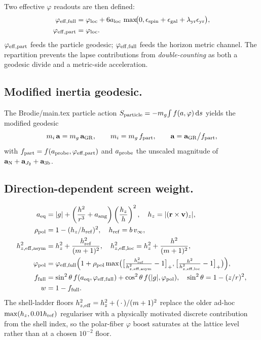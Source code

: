\documentclass[11pt]{amsart}
\begin{document}
Two effective $\varphi$ readouts are then defined:
\begin{align}
\varphi_{\rm eff,full} &= \varphi_{\rm loc}+6a_{\rm loc}\,
  \max\!\bigl(0,\epsilon_{\rm spin}+\epsilon_{\rm gal}+\lambda_{\rm yr}\epsilon_{\rm yr}\bigr),\\
\varphi_{\rm eff,part} &= \varphi_{\rm loc}.
\end{align}
$\varphi_{\rm eff,part}$ feeds the particle geodesic; $\varphi_{\rm eff,full}$ feeds the
horizon metric channel. The repartition prevents the lapse contributions from
\emph{double-counting} as both a geodesic divide and a metric-side acceleration.

\subsection{Modified inertia geodesic.}
The Brodie/main.tex particle action
\(S_{\rm particle}=-m_g\!\int f(a,\varphi)\,\mathrm ds\)
yields the modified geodesic
\begin{equation}\label{eq:geodesic}
m_i\,\mathbf a = m_g\,\mathbf a_{\rm GR},\qquad
m_i = m_g\, f_{\rm part},\qquad
\mathbf a = \mathbf a_{\rm GR}\big/f_{\rm part},
\end{equation}
with $f_{\rm part}=f(a_{\rm probe},\varphi_{\rm eff,part})$ and $a_{\rm probe}$ the
unscaled magnitude of $\mathbf a_{\rm N}+\mathbf a_{J_2}+\mathbf a_{3{\rm b}}$.

\subsection{Direction-dependent screen weight.}
\begin{align}
a_{\rm eq} &= |g|+\left(\frac{h^2}{r^3}+a_{\rm ang}\right)
  \left(\frac{h_z}{h}\right)^2,\quad
h_z=|(\mathbf r\times\mathbf v)_z|,\\
\rho_{\rm pol} &= 1-(h_z/h_{\rm ref})^2,\quad h_{\rm ref}=b\,v_\infty,\\
h_{z,{\rm eff,asym}}^2 &= h_z^2+\frac{h_{\rm ref}^2}{(m+1)^2},\quad
h_{z,{\rm eff,loc}}^2 = h_z^2+\frac{h^2}{(m+1)^2},\\
\varphi_{\rm pol} &= \varphi_{\rm eff,full}\Bigl(1+\rho_{\rm pol}
  \max\bigl(\bigl[\tfrac{h_{\rm ref}^2}{h_{z,{\rm eff,asym}}^2}-1\bigr]_+,
           \bigl[\tfrac{h^2}{h_{z,{\rm eff,loc}}^2}-1\bigr]_+\bigr)\Bigr),\\
f_{\rm full} &= \sin^2\theta\,f(a_{\rm eq},\varphi_{\rm eff,full})
  +\cos^2\theta\,f(|g|,\varphi_{\rm pol}),\quad \sin^2\theta=1-(z/r)^2,\\
w &= 1-f_{\rm full}.
\end{align}
The shell-ladder floors $h_{z,{\rm eff}}^2 = h_z^2 + (\,\cdot\,)/(m+1)^2$ replace the older
ad-hoc $\max(h_z,0.01h_{\rm ref})$ regulariser with a physically motivated discrete
contribution from the shell index, so the polar-fiber $\varphi$ boost saturates at the
lattice level rather than at a chosen $10^{-2}$ floor.
\end{document}

